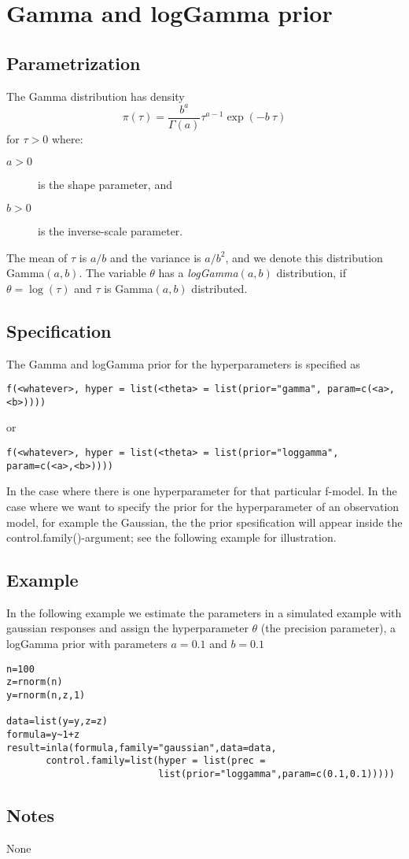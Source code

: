 \documentclass[a4paper,11pt]{article}
\begin{document}
\section*{Gamma and logGamma prior}

\subsection*{Parametrization}
The Gamma  distribution has density
\begin{equation}
    \pi(\tau)=\frac{b^a}{\Gamma(a)}\tau^{a-1}\exp(-b\ \tau)
\end{equation}
for $\tau>0$ where:
\begin{description}
\item[$a>0$] is the shape parameter, and
\item[$b>0$] is the inverse-scale parameter.
\end{description}
The mean of $\tau$ is $a/b$ and the variance is $a/b^2$, and we denote
this distribution Gamma$(a,b)$. The variable $\theta$ has a
\emph{logGamma}$(a,b)$ distribution, if $\theta=\log(\tau)$ and $\tau$
is Gamma$(a,b)$ distributed.

\subsection*{Specification}
The Gamma and logGamma prior for the hyperparameters is specified as
\begin{center}
    {\tt f(<whatever>, hyper = list(<theta> =
        list(prior="gamma", param=c(<a>,<b>))))}
\end{center}
or
\begin{center}
    {\tt f(<whatever>, hyper = list(<theta> =
        list(prior="loggamma", param=c(<a>,<b>))))}
\end{center}
In the case where there is one hyperparameter for that particular
f-model. In the case where we want to specify the prior for the
hyperparameter of an observation model, for example the Gaussian, the
the prior spesification will appear inside the
control.family()-argument; see the following example for illustration.

\subsection*{Example}

In the following example we estimate the parameters in a simulated
example with gaussian responses and assign the hyperparameter $\theta$
(the precision parameter), a logGamma prior with parameters $a=0.1$
and $b=0.1$


\begin{verbatim}
n=100
z=rnorm(n)
y=rnorm(n,z,1)

data=list(y=y,z=z)
formula=y~1+z
result=inla(formula,family="gaussian",data=data,
       control.family=list(hyper = list(prec =
                           list(prior="loggamma",param=c(0.1,0.1)))))
\end{verbatim}

\subsection*{Notes}
None
\end{document}
